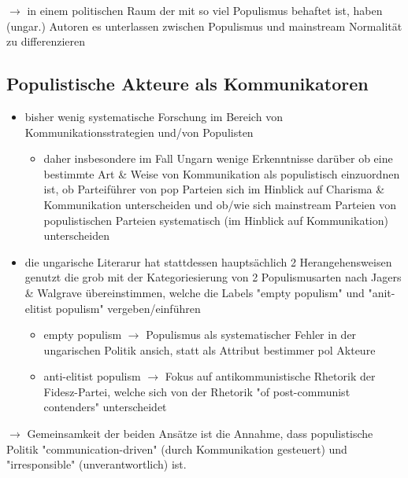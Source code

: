 \documentclass[11pt]{article}
\begin{document}
\(\rightarrow\) in einem politischen Raum der mit so viel Populismus behaftet ist, haben (ungar.) Autoren es unterlassen zwischen Populismus und mainstream Normalität zu differenzieren
\subsection{Populistische Akteure als Kommunikatoren}
\label{sec:org8e16dc9}
\begin{itemize}
\item bisher wenig systematische Forschung im Bereich von Kommunikationsstrategien und/von Populisten
\begin{itemize}
\item daher insbesondere im Fall Ungarn wenige Erkenntnisse darüber ob eine bestimmte Art \& Weise von Kommunikation als populistisch einzuordnen ist, ob Parteiführer von pop Parteien sich im Hinblick auf Charisma \& Kommunikation unterscheiden und ob/wie sich mainstream Parteien von populistischen Parteien systematisch (im Hinblick auf Kommunikation) unterscheiden
\end{itemize}

\item die ungarische Literarur hat stattdessen hauptsächlich 2 Herangehensweisen genutzt die grob mit der Kategoriesierung von 2 Populismusarten nach Jagers \& Walgrave übereinstimmen, welche die Labels "empty populism" und "anit-elitist populism" vergeben/einführen
\begin{itemize}
\item empty populism \(\rightarrow\) Populismus als systematischer Fehler in der ungarischen Politik ansich, statt als Attribut bestimmer pol Akteure
\item anti-elitist populism \(\rightarrow\) Fokus auf antikommunistische Rhetorik der Fidesz-Partei, welche sich von der Rhetorik "of post-communist contenders" unterscheidet
\end{itemize}
\end{itemize}

\(\rightarrow\) Gemeinsamkeit der beiden Ansätze ist die Annahme, dass populistische Politik "communication-driven" (durch Kommunikation gesteuert) und "irresponsible" (unverantwortlich) ist.
\end{document}
